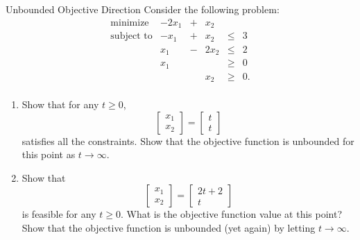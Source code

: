 \begin{ex}{Unbounded Objective Direction}{}
Consider the following problem:
\[
\begin{array}{rrcrll}
\text{minimize } & -2x_1 & + & x_2 & \\
\text{subject to} & -x_1 & + & x_2 & \leq & 3 \\
& x_1 & - & 2x_2 & \leq & 2 \\
& x_1 & & & \geq & 0 \\
& & & x_2 & \geq & 0. \\
\end{array}
\]

\begin{enumerate}
\item Show that for any \(t \geq 0\),
\[
\begin{bmatrix} x_1 \\ x_2 \end{bmatrix} = \begin{bmatrix} t \\ t \end{bmatrix}
\]
satisfies all the constraints. Show that the objective function is unbounded for this point as $t \to \infty$.

\item Show that \[
\begin{bmatrix} x_1 \\ x_2 \end{bmatrix} = \begin{bmatrix} 2t+2 \\ t \end{bmatrix}
\]
 is feasible for any \(t \geq 0\).  What is the objective function value at this point?  Show that the objective function is unbounded (yet again) by letting $t \to \infty$.
 \end{enumerate}
 \end{ex}

